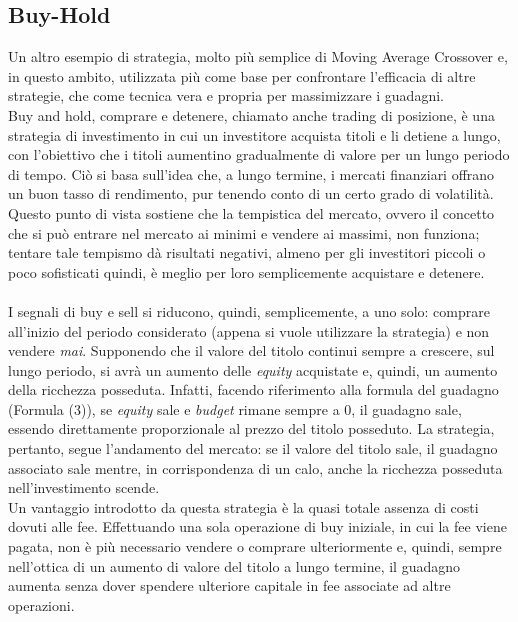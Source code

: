 \documentclass[a4paper,12pt]{report}
\begin{document}
\subsection{Buy-Hold}
Un altro esempio di strategia, molto più semplice di Moving Average Crossover e, in questo ambito, utilizzata più come base per confrontare l'efficacia di altre strategie, che come tecnica vera e propria per massimizzare i guadagni.\\
Buy and hold, comprare e detenere, chiamato anche trading di posizione, è una strategia di investimento in cui un investitore acquista titoli e li detiene a lungo, con l'obiettivo che i titoli aumentino gradualmente di valore per un lungo periodo di tempo. Ciò si basa sull'idea che, a lungo termine, i mercati finanziari offrano un buon tasso di rendimento, pur tenendo conto di un certo grado di volatilità. Questo punto di vista sostiene che la tempistica del mercato, ovvero il concetto che si può entrare nel mercato ai minimi e vendere ai massimi, non funziona; tentare tale tempismo dà risultati negativi, almeno per gli investitori piccoli o poco sofisticati quindi, è meglio per loro semplicemente acquistare e detenere.\\~\\ I segnali di buy e sell si riducono, quindi, semplicemente, a uno solo: comprare all'inizio del periodo considerato (appena si vuole utilizzare la strategia) e non vendere \textit{mai}. Supponendo che il valore del titolo continui sempre a crescere, sul lungo periodo, si avrà un aumento delle \textit{equity} acquistate e, quindi, un aumento della ricchezza posseduta. Infatti, facendo riferimento alla formula del guadagno (Formula (3)), se \textit{equity} sale e \textit{budget} rimane sempre a 0, il guadagno sale, essendo direttamente proporzionale al prezzo del titolo posseduto. La strategia, pertanto, segue l'andamento del mercato: se il valore del titolo sale, il guadagno associato sale mentre, in corrispondenza di un calo, anche la ricchezza posseduta nell'investimento scende.\\
Un vantaggio introdotto da questa strategia è la quasi totale assenza di costi dovuti alle fee. Effettuando una sola operazione di buy iniziale, in cui la fee viene pagata, non è più necessario vendere o comprare ulteriormente e, quindi, sempre nell'ottica di un aumento di valore del titolo a lungo termine, il guadagno aumenta senza dover spendere ulteriore capitale in fee associate ad altre operazioni.\\~\\
\end{document}
